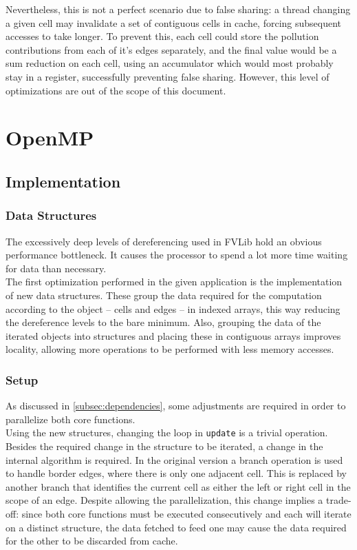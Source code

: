 \documentclass[9pt,twocolumn]{scrartcl}
\begin{document}
Nevertheless, this is not a perfect scenario due to false sharing: a thread changing a given cell may invalidate a set of contiguous cells in cache, forcing subsequent accesses to take longer. To prevent this, each cell could store the pollution contributions from each of it's edges separately, and the final value would be a sum reduction on each cell, using an accumulator which would most probably stay in a register, successfully preventing false sharing. However, this level of optimizations are out of the scope of this document.\\

\section{OpenMP}
\label{sec:openmp}
\subsection{Implementation}
\subsubsection{Data Structures}
The excessively deep levels of dereferencing used in FVLib hold an obvious performance bottleneck. It causes the processor to spend a lot more time waiting for data than necessary.\\

The first optimization performed in the given application is the implementation of new data structures. These group the data required for the computation according to the object -- cells and edges -- in indexed arrays, this way reducing the dereference levels to the bare minimum. Also, grouping the data of the iterated objects into structures and placing these in contiguous arrays improves locality, allowing more operations to be performed with less memory accesses.\\

\subsubsection{Setup}
As discussed in \autoref{subsec:dependencies}, some adjustments are required in order to parallelize both core functions.\\

Using the new structures, changing the loop in \texttt{update} is a trivial operation. Besides the required change in the structure to be iterated, a change in the internal algorithm is required. In the original version a branch operation is used to handle border edges, where there is only one adjacent cell. This is replaced by another branch that identifies the current cell as either the left or right cell in the scope of an edge. Despite allowing the parallelization, this change implies a trade-off: since both core functions must be executed consecutively and each will iterate on a distinct structure, the data fetched to feed one may cause the data required for the other to be discarded from cache.\\
\end{document}
